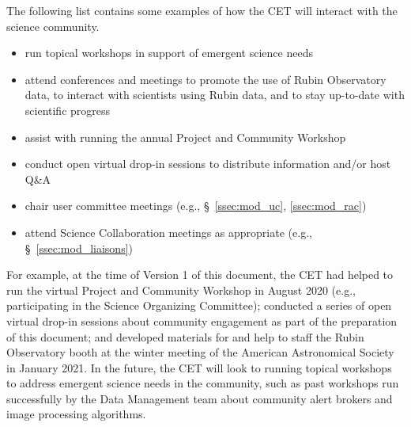 \documentclass[DM,lsstdraft,toc]{lsstdoc}
\begin{document}
The following list contains some examples of how the CET will interact with the science community.
\begin{itemize}
\item run topical workshops in support of emergent science needs
\item attend conferences and meetings to promote the use of Rubin Observatory data, to interact with scientists using Rubin data, and to stay up-to-date with scientific progress
\item assist with running the annual Project and Community Workshop
\item conduct open virtual drop-in sessions to distribute information and/or host Q\&A 
\item chair user committee meetings (e.g., \S~\ref{ssec:mod_uc}, \ref{ssec:mod_rac})
\item attend Science Collaboration meetings as appropriate (e.g., \S~\ref{ssec:mod_liaisons})
\end{itemize}

For example, at the time of Version 1 of this document, the CET had helped to run the virtual Project and Community Workshop in August 2020 (e.g., participating in the Science Organizing Committee); conducted a series of open virtual drop-in sessions about community engagement as part of the preparation of this document; and developed materials for and help to staff the Rubin Observatory booth at the winter meeting of the American Astronomical Society in January 2021. 
In the future, the CET will look to running topical workshops to address emergent science needs in the community, such as past workshops run successfully by the Data Management team about community alert brokers and image processing algorithms. 
\end{document}
